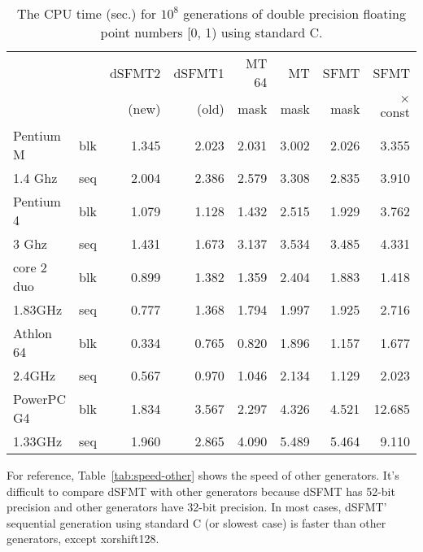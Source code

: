 \documentclass{svmult}
\begin{document}
\begin{table}
  \begin{center}
    \begin{tabular}{|ll|r|r|r|r|r|r|} \hline
      &  & dSFMT2 & dSFMT1 & MT 64 & MT & SFMT & SFMT \\
      &  &(new)&(old)& mask & mask & mask & $\times$ const \\ \hline\hline
      Pentium M & blk & 1.345 & 2.023 & 2.031 & 3.002 & 2.026 & 3.355 \\
      1.4 Ghz & seq & 2.004 & 2.386 & 2.579 & 3.308 & 2.835 & 3.910 \\ \hline
      Pentium 4 & blk & 1.079 & 1.128 & 1.432 & 2.515 & 1.929 & 3.762 \\
      3 Ghz & seq & 1.431 & 1.673 & 3.137 & 3.534 & 3.485 & 4.331 \\ \hline
      core 2 duo & blk & 0.899 & 1.382 & 1.359 & 2.404 & 1.883 & 1.418 \\
      1.83GHz & seq & 0.777 & 1.368 & 1.794 & 1.997 & 1.925 & 2.716 \\ \hline
      Athlon 64 & blk & 0.334 & 0.765 & 0.820 & 1.896 & 1.157 & 1.677 \\
      2.4GHz & seq & 0.567 & 0.970 & 1.046 & 2.134 & 1.129 & 2.023 \\ \hline
      PowerPC G4 & blk & 1.834 & 3.567 & 2.297 & 4.326 & 4.521 & 12.685 \\
      1.33GHz & seq & 1.960 & 2.865 & 4.090 & 5.489 & 5.464 & 9.110 \\ \hline
    \end{tabular}
    \caption{The CPU time (sec.) for $10^8$ generations of double precision
      floating point numbers [0, 1) using standard C.}
    \label{tab:speed-c}
  \end{center}
\end{table}

For reference, Table~\ref{tab:speed-other} shows the speed of other
generators. It's difficult to compare dSFMT with other generators
because dSFMT has 52-bit precision and other generators have 32-bit
precision. In most cases, dSFMT' sequential generation using standard
C (or slowest case) is faster than other generators, except xorshift128.
\end{document}
